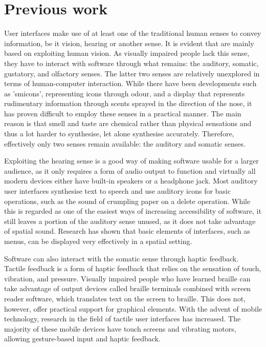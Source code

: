 \section{Previous work}
\label{section:previouswork}
User interfaces make use of at least one of the traditional human senses to convey information, be it vision, hearing or another sense. It is evident that  are mainly based on exploiting human vision. As visually impaired people lack this sense, they have to interact with software through what remains: the auditory, somatic, gustatory, and olfactory senses. The latter two senses are relatively unexplored in terms of human-computer interaction. While there have been developments such as 'smicons', representing icons through odour\cite{kaye2001symbolic}, and a display that represents rudimentary information through scents sprayed in the direction of the nose\cite{yanagida2004projection}, it has proven difficult to employ these senses in a practical manner. The main reason is that smell and taste are chemical rather than physical sensations and thus a lot harder to synthesise, let alone synthesise accurately\cite{kortum2008hci}. Therefore, effectively only two senses remain available: the auditory and somatic senses.

Exploiting the hearing sense is a good way of making software usable for a larger audience, as it only requires a form of audio output to function and virtually all modern devices either have built-in speakers or a headphone jack. Most auditory user interfaces synthesise text to speech and use auditory icons for basic operations, such as the sound of crumpling paper on a delete operation\cite{mynatt1995transforming}. While this is regarded as one of the easiest ways of increasing accessibility of software, it still leaves a portion of the auditory sense unused, as it does not take advantage of spatial sound. Research has shown that basic elements of interfaces, such as menus, can be displayed very effectively in a spatial setting\cite{frauenberger2004spatial}.

Software can also interact with the somatic sense through haptic feedback. Tactile feedback is a form of haptic feedback that relies on the sensation of touch, vibration, and pressure. Visually impaired people who have learned braille can take advantage of output devices called braille terminals combined with screen reader software, which translates text on the screen to braille. This does not, however, offer practical support for graphical elements. With the advent of mobile technology, research in the field of tactile user interfaces has increased. The majority of these mobile devices have touch screens and vibrating motors, allowing gesture-based input and haptic feedback\cite{kane2008slide, yatani2009semfeel}.

